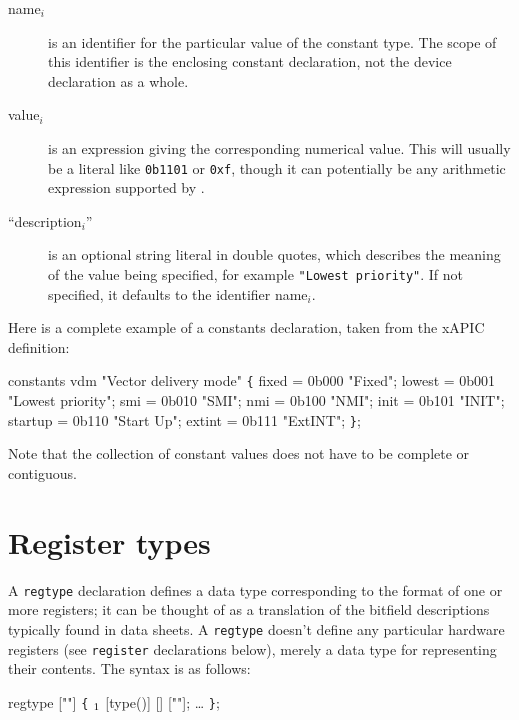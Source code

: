 \documentclass[a4paper,11pt,twoside]{report}
\begin{document}
\begin{description}

\item[name$_i$] is an identifier for the particular value of the
  constant type.  The scope of this identifier is the enclosing
  constant declaration, not the device declaration as a whole.

\item[value$_i$] is an expression giving the corresponding numerical
  value.  This will usually be a literal like \texttt{0b1101} or
  \texttt{0xf}, though it can potentially be any arithmetic expression
  supported by \Mac. 

\item[``description$_i$''] is an optional string literal in double
  quotes, which describes the meaning of the value being specified,
  for example \texttt{"Lowest priority"}.  If not specified, it
  defaults to the identifier name$_i$. 

\end{description}

Here is a complete example of a constants declaration, taken from the
xAPIC definition: 

\begin{example}
constants vdm "Vector delivery mode" \verb+{+
       fixed   = 0b000 "Fixed";
       lowest  = 0b001 "Lowest priority";
       smi     = 0b010 "SMI";
       nmi     = 0b100 "NMI";
       init    = 0b101 "INIT";
       startup = 0b110 "Start Up";
       extint  = 0b111 "ExtINT";
\verb+}+;
\end{example}

Note that the collection of constant values does not have to be
complete or contiguous. 

\section{Register types}\label{sec:regtypes}

A \texttt{regtype} declaration defines a data type corresponding to the
format of one or more registers; it can be thought of as a translation
of the bitfield descriptions typically found in data sheets.   A
\texttt{regtype} doesn't define any particular hardware registers
(see \texttt{register} declarations below), merely a data type for
representing their contents. 
The syntax is as follows:

\begin{syntax}
regtype  [""] \verb+{+
   \(\sb{1}\)  [type()] [] [""];
   \ldots
\verb+}+;
\end{syntax}
\end{document}
